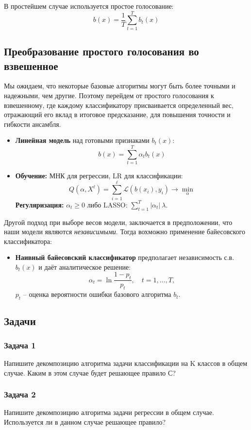 В простейшем случае используется простое голосование:
$$b(x) = \frac{1}{T} \sum_{t=1}^T  b_t(x)$$

\subsection*{Преобразование простого голосования во взвешенное}
Мы ожидаем, что некоторые базовые алгоритмы могут быть более точными и надежными, чем другие. Поэтому перейдем от простого голосования к взвешенному, где каждому классификатору присваивается определенный вес, отражающий его вклад в итоговое предсказание, для повышения точности и гибкости ансамбля.
\begin{itemize}
    \item \textbf{Линейная модель} над готовыми признаками $b_t(x)$:
    $$b(x) = \sum_{t=1}^T \alpha_t b_t(x)$$
    \item \textbf{Обучение:} МНК для регрессии, LR для классификации: 
    $$Q(\alpha, X^\ell) = \sum_{i=1}^\ell \mathcal{L}(b(x_i), y_i) \to \min_\alpha$$
    \textbf{Регуляризация:} $\alpha_t \ge 0$ либо LASSO: $\sum_{t=1}^T |\alpha_t| \
    \lambda$. 
\end{itemize}
Другой подход при выборе весов модели, заключается в предположении, что наши модели являются \textit{независимыми}. Тогда вохможно применение байесовского классификатора:
\begin{itemize}
    \item \textbf{Наивный байесовский классификатор} предполагает независимость с.в. $b_t(x)$ и даёт аналитическое решение: 
    $$\alpha_t = \ln \frac{1 - p_t}{p_t}, \quad t = 1, \dots, T,$$
    $p_t$ – оценка вероятности ошибки базового алгоритма $b_t$.
\end{itemize}




\subsection*{Задачи}
\subsubsection*{Задача 1}
Напишите декомпозицию алгоритма задачи классификации на K классов в общем случае. Каким в этом случае будет решающее правило С?
\subsubsection*{Задача 2}
Напишите декомпозицию алгоритма задачи регрессии в общем случае. Используется ли в данном случае решающее правило?
